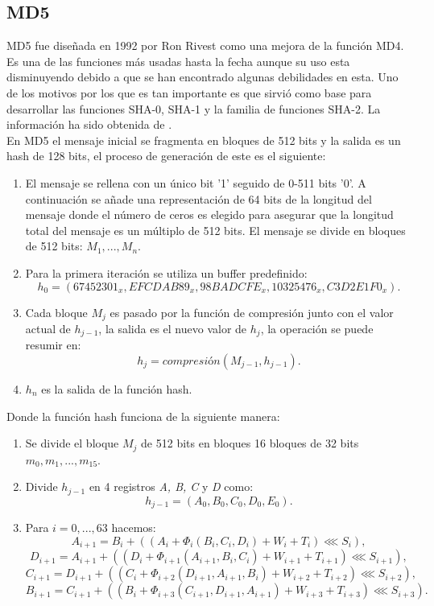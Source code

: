 \begin{aligned*}
\subsection{MD5}
MD5 fue diseñada en 1992 por Ron Rivest como una mejora de la función MD4. Es una de las funciones más usadas hasta la fecha aunque su uso esta disminuyendo debido a que se han encontrado algunas debilidades en esta. Uno de los motivos por los que es tan importante es que sirvió como base para desarrollar las funciones SHA-0, SHA-1 y la familia de funciones SHA-2.
La información ha sido obtenida de \cite{Wang2005}.\\
En MD5 el mensaje inicial se fragmenta en bloques de 512 bits y la salida es un hash de 128 bits, el proceso de generación de este es el siguiente:

\begin{enumerate}
	\item El mensaje se rellena con un único bit '1' seguido de 0-511 bits '0'. A continuación se añade una representación de 64 bits de la longitud del mensaje donde el número de ceros es elegido para asegurar que la longitud total del mensaje es un múltiplo de 512 bits. El mensaje se divide en bloques de 512 bits: $M_1,...,M_n$.
	\item Para la primera iteración se utiliza un buffer predefinido:
	$$
		h_0=(67452301_x, EFCDAB89_x, 98BADCFE_x, 10325476_x, C3D2E1F0_x).
	$$
	\item Cada bloque $M_j$ es pasado por la función de compresión junto con el valor actual de $h_{j-1}$, la salida es el nuevo valor de $h_j$, la operación se puede resumir en:
	$$
		h_j=compresión(M_{j-1},h_{j-1}).
	$$
	\item $h_n$ es la salida de la función hash.
\end{enumerate}
Donde la función hash funciona de la siguiente manera:
\begin{enumerate}
	\item Se divide el bloque $M_j$ de 512 bits en bloques 16 bloques de 32 bits $m_0,m_1,...,m_{15}$. 
\item Divide $h_{j-1}$ en 4 registros \emph{A, B, C} y \emph{D} como:
	$$
		h_{j-1} = (A_0, B_0, C_0, D_0, E_0).
	$$
	\item Para $i=0,...,63$ hacemos:
	$$
		A_{i+1}=B_i+((A_i+\Phi_i(B_i,C_i,D_i)+W_i+T_i)\lll S_i),
	$$
	$$
		D_{i+1}=A_{i+1}+((D_i+\Phi_{i+1}(A_{i+1},B_i,C_i)+W_{i+1}+T_{i+1})\lll S_{i+1}),
	$$
	$$
		C_{i+1}=D_{i+1}+((C_i+\Phi_{i+2}(D_{i+1},A_{i+1},B_i)+W_{i+2}+T_{i+2})\lll S_{i+2}),
	$$
	$$
		B_{i+1}=C_{i+1}+((B_i+\Phi_{i+3}(C_{i+1},D_{i+1},A_{i+1})+W_{i+3}+T_{i+3})\lll S_{i+3}).
$$
\end{enumerate}
\end{aligned*}
